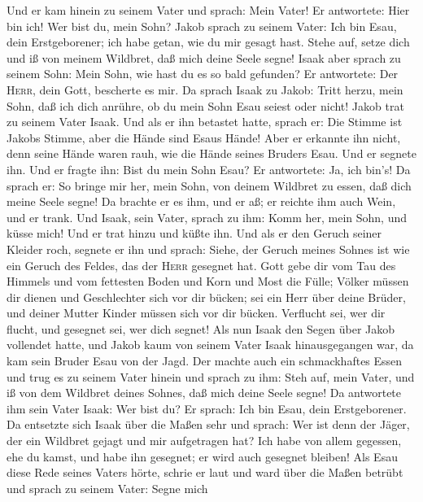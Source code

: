 Und er kam hinein zu seinem Vater und sprach: Mein Vater! Er antwortete:
Hier bin ich! Wer bist du, mein Sohn?  Jakob sprach zu
seinem Vater: Ich bin Esau, dein Erstgeborener; ich habe getan, wie du
mir gesagt hast. Stehe auf, setze dich und iß von meinem Wildbret, daß
mich deine Seele segne!  Isaak aber sprach zu seinem
Sohn: Mein Sohn, wie hast du es so bald gefunden? Er antwortete: Der
\textsc{Herr}, dein Gott, bescherte es mir.  Da sprach
Isaak zu Jakob: Tritt herzu, mein Sohn, daß ich dich anrühre, ob du mein
Sohn Esau seiest oder nicht!  Jakob trat zu seinem Vater
Isaak. Und als er ihn betastet hatte, sprach er: Die Stimme ist Jakobs
Stimme, aber die Hände sind Esaus Hände!  Aber er
erkannte ihn nicht, denn seine Hände waren rauh, wie die Hände seines
Bruders Esau. Und er segnete ihn.  Und er fragte ihn:
Bist du mein Sohn Esau? Er antwortete: Ja, ich bin's!  Da
sprach er: So bringe mir her, mein Sohn, von deinem Wildbret zu essen,
daß dich meine Seele segne! Da brachte er es ihm, und er aß; er reichte
ihm auch Wein, und er trank.  Und Isaak, sein Vater,
sprach zu ihm: Komm her, mein Sohn, und küsse mich!  Und
er trat hinzu und küßte ihn. Und als er den Geruch seiner Kleider roch,
segnete er ihn und sprach: Siehe, der Geruch meines Sohnes ist wie ein
Geruch des Feldes, das der \textsc{Herr} gesegnet hat. 
Gott gebe dir vom Tau des Himmels und vom fettesten Boden und Korn und
Most die Fülle;  Völker müssen dir dienen und
Geschlechter sich vor dir bücken; sei ein Herr über deine Brüder, und
deiner Mutter Kinder müssen sich vor dir bücken. Verflucht sei, wer dir
flucht, und gesegnet sei, wer dich segnet!  Als nun Isaak
den Segen über Jakob vollendet hatte, und Jakob kaum von seinem Vater
Isaak hinausgegangen war, da kam sein Bruder Esau von der Jagd.
 Der machte auch ein schmackhaftes Essen und trug es zu
seinem Vater hinein und sprach zu ihm: Steh auf, mein Vater, und iß von
dem Wildbret deines Sohnes, daß mich deine Seele segne! 
Da antwortete ihm sein Vater Isaak: Wer bist du? Er sprach: Ich bin
Esau, dein Erstgeborener.  Da entsetzte sich Isaak über
die Maßen sehr und sprach: Wer ist denn der Jäger, der ein Wildbret
gejagt und mir aufgetragen hat? Ich habe von allem gegessen, ehe du
kamst, und habe ihn gesegnet; er wird auch gesegnet bleiben!
 Als Esau diese Rede seines Vaters hörte, schrie er laut
und ward über die Maßen betrübt und sprach zu seinem Vater: Segne mich
